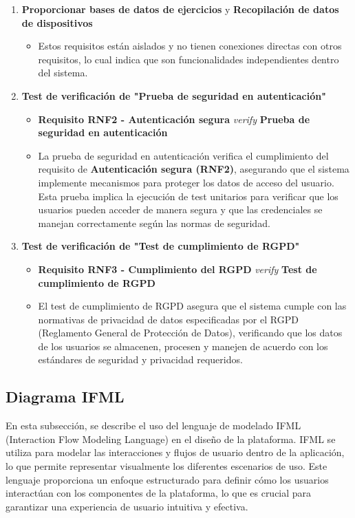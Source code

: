 \documentclass{article}
\begin{document}
\begin{enumerate}
	\item \textbf{Proporcionar bases de datos de ejercicios} y \textbf{Recopilación de datos de dispositivos}
	\begin{itemize}
		\item Estos requisitos están aislados y no tienen conexiones directas con otros requisitos, lo cual indica que son funcionalidades independientes dentro del sistema.
	\end{itemize}
	\item \textbf{Test de verificación de "Prueba de seguridad en autenticación"}
	
	\begin{itemize}
		\item \textbf{Requisito RNF2 - Autenticación segura} \textit{verify} \textbf{Prueba de seguridad en autenticación}
		\item La prueba de seguridad en autenticación verifica el cumplimiento del requisito de \textbf{Autenticación segura (RNF2)}, asegurando que el sistema implemente mecanismos para proteger los datos de acceso del usuario. Esta prueba implica la ejecución de test unitarios para verificar que los usuarios pueden acceder de manera segura y que las credenciales se manejan correctamente según las normas de seguridad.
	\end{itemize}
	
	\item \textbf{Test de verificación de "Test de cumplimiento de RGPD"}
	
	\begin{itemize}
		\item \textbf{Requisito RNF3 - Cumplimiento del RGPD} \textit{verify} \textbf{Test de cumplimiento de RGPD}
		\item El test de cumplimiento de RGPD asegura que el sistema cumple con las normativas de privacidad de datos especificadas por el RGPD (Reglamento General de Protección de Datos), verificando que los datos de los usuarios se almacenen, procesen y manejen de acuerdo con los estándares de seguridad y privacidad requeridos.
	\end{itemize}
	
\end{enumerate}

\newpage
\subsection{Diagrama IFML}


En esta subsección, se describe el uso del lenguaje de modelado IFML (Interaction Flow Modeling Language) en el diseño de la plataforma. IFML se utiliza para modelar las interacciones y flujos de usuario dentro de la aplicación, lo que permite representar visualmente los diferentes escenarios de uso. Este lenguaje proporciona un enfoque estructurado para definir cómo los usuarios interactúan con los componentes de la plataforma, lo que es crucial para garantizar una experiencia de usuario intuitiva y efectiva.
\end{document}
